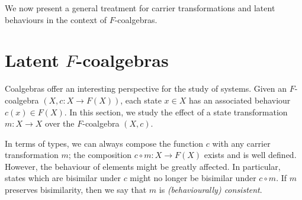 We now present a general treatment for carrier transformations and latent behaviours in the context of $F$-coalgebras. 

\section{Latent $F$-coalgebras}
Coalgebras offer an interesting perspective for the study of systems. Given an $F$-coalgebra $(X,c\colon X\rightarrow F(X))$, each state $x\in X$ has an associated behaviour $c(x)\in F(X)$. In this section, we study the effect of a state transformation $m\colon X\rightarrow X$ over the $F$-coalgebra $(X,c)$. 

In terms of types, we can always compose the function $c$ with any carrier transformation $m$; the composition $c \circ m\colon X\rightarrow F(X)$ exists and is well defined. However, the behaviour of elements might be greatly affected. In particular, states which are bisimilar under $c$ might no longer be bisimilar under $c \circ m$. If $m$ preserves bisimilarity, then we say that $m$ is \emph{(behaviourally) consistent}.

